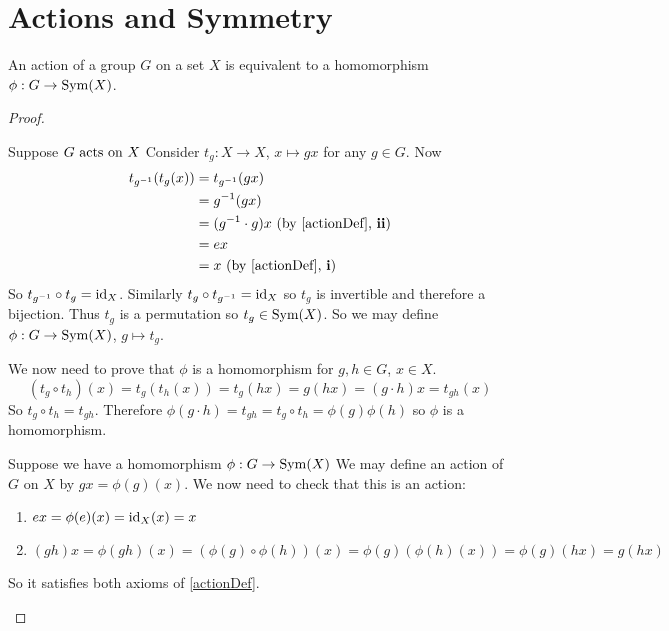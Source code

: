 \documentclass[../main.tex]{subfiles}
\begin{document}
\section{Actions and Symmetry}
\begin{theorem}
  An action of a group $G$ on a set $X$ is equivalent to a homomorphism $\phi : G \to \operatorname{Sym}(X)$.
  \label{actionHomTheorem}
\end{theorem}
\begin{proof}
  \begin{proofdirection}{Suppose $G \text{ acts on } X$}
    Consider $t_g : X \to X$, $x \mapsto gx$ for any $g \in G$.
    Now
    \begin{align*}
      t_{g^{-1}}(t_g(x)) &= t_{g^{-1}}(gx) \\
                         &= g^{-1}(gx) \\
                         &= (g^{-1} \cdot g)x \text{ (by \cref{actionDef}, \textbf{ii})}\\
                         &= ex \\
                         &= x \text{ (by \cref{actionDef}, \textbf{i})}
    \end{align*}
    So $t_{g^{-1}} \circ t_g  = \mathrm{id}_X$.
    Similarly $t_g \circ t_{g^{-1}} = \mathrm{id}_X$ so $t_g$ is invertible and therefore a bijection.
    Thus $t_g$ is a permutation so $t_g \in \operatorname{Sym}(X)$.
    So we may define $\phi: G \to \operatorname{Sym}(X)$, $g \mapsto t_g$.

    We now need to prove that $\phi$ is a homomorphism for $g, h \in G$, $x \in X$.
    \[
      (t_g \circ t_h)(x) = t_g(t_h(x)) = t_g(hx) = g(hx) = (g \cdot h)x = t_{gh}(x)
    \]
    So $t_g \circ t_h = t_{gh}$.
    Therefore $\phi(g \cdot h) = t_{gh} = t_g \circ t_h = \phi(g)\phi(h)$ so $\phi$ is a homomorphism.
  \end{proofdirection}
  \begin{proofdirection}{Suppose we have a homomorphism $\phi: G \to \operatorname{Sym}(X)$}
    We may define an action of $G$ on $X$ by $gx = \phi(g)(x)$.
    We now need to check that this is an action:
    \begin{enumerate}
      \item $ex = \phi(e)(x) = \mathrm{id}_X(x) = x$
      \item $(gh)x = \phi(gh)(x) = (\phi(g) \circ \phi(h))(x) = \phi(g)(\phi(h)(x)) = \phi(g)(hx) = g(hx)$
    \end{enumerate}
    So it satisfies both axioms of \cref{actionDef}.
  \end{proofdirection}
\end{proof}
\end{document}
